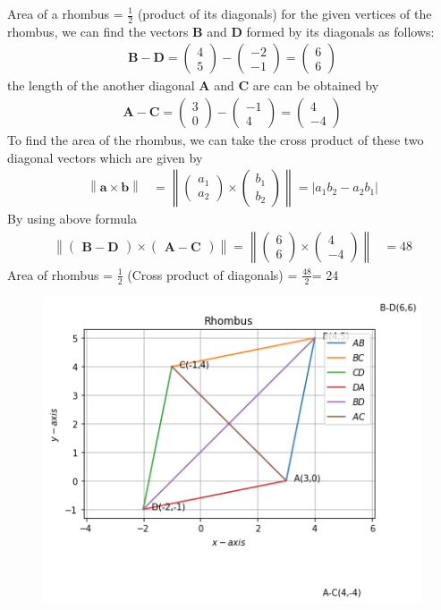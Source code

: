 \documentclass[12pt]{article}
\providecommand{\norm}[1]{\left\lVert#1\right\rVert}
\newcommand{\myvec}[1]{\ensuremath{\begin{pmatrix}#1\end{pmatrix}}}
\let\vec\mathbf
\begin{document}
\begin{enumerate}
Area of a rhombus  = $\frac{1}{2}$ (product of its diagonals)
for the given vertices of the rhombus, we can find the vectors $\vec{B}$ and $\vec{D}$ formed by its diagonals as follows:
\begin{align}
 \vec{B-D}= \myvec{4 \\ 5} - \myvec{-2 \\-1}= \myvec{6\\6}
\end{align}
the length of the another diagonal $\vec{A}$ and $\vec{C}$ are can be obtained by
\begin{align}
  \vec{A-C}= \myvec{3 \\ 0} - \myvec{-1 \\4}= \myvec{4\\-4}
\end{align}
To find the area of the rhombus, we can take the cross product of these two diagonal vectors which are given by
\begin{align}
    \norm{\vec{a}\times \vec{b}} &=\norm{\myvec{a_1\\a_2} \times \myvec{b_1\\b_2}} =  \lvert a_1 b_2 - a_2 b_1 \rvert  
\end{align}
By using above formula
\begin{align}
        \norm{\myvec{\vec{B-D}}\times \myvec{\vec{A-C}}} = \norm{\myvec{6\\6} \times \myvec{4\\-4}} &= 48 
\end{align}
Area of rhombus = $\frac{1}{2}$ (Cross product of diagonals)
                = $\frac{48}{2}$= 24
\begin{figure}[!h]
 \begin{center}
  \includegraphics[width=\columnwidth]{./figs/fig.png}
 \end{center}
\caption{}
\label{fig:Fig1}
\end{figure}
\end{enumerate}
\end{document}
